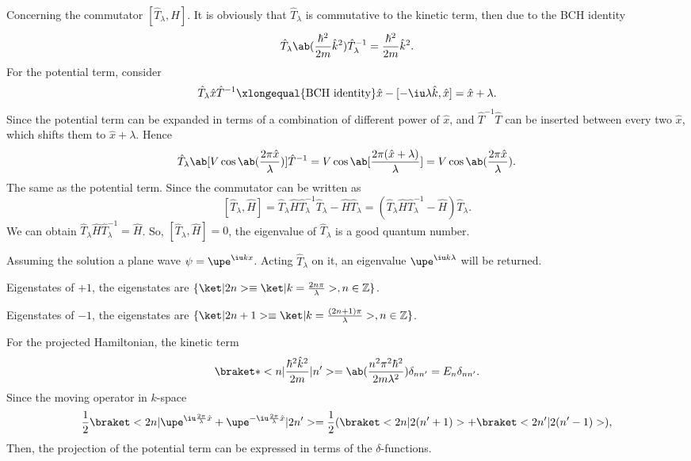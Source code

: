 \begin{solution}
\begin{enumext}
    Concerning the commutator $[\hat T_\lambda, H]$.
    It is obviously that $\hat T_\lambda$ is commutative to the kinetic term,
    then due to the BCH identity
    \[
      \hat T_\lambda \ab(\frac{\hbar^2}{2m} \hat k^2) \hat T_\lambda^{-1}
    = \frac{\hbar^2}{2m} \hat k^2.
    \]
    For the potential term, consider
    \[
      \hat T_\lambda \hat x \hat T^{-1} \xlongequal{\text{BCH identity}}
      \hat x - [-\iu\lambda \hat k, \hat x] = \hat x + \lambda.
    \]
    Since the potential term can be expanded in terms of a combination of
    different power of $\hat x$, and $\hat T^{-1}\hat T$ can be inserted between
    every two $\hat x$, which shifts them to $\hat x + \lambda$. Hence
    \[
      \hat T_\lambda \ab[V\cos\ab(\frac{2\pi\hat x}{\lambda})] \hat T^{-1}
    = V\cos\ab[\frac{2\pi(\hat x + \lambda)}{\lambda}]
    = V\cos\ab(\frac{2\pi\hat x}{\lambda}).
    \]
    The same as the potential term.
    Since the commutator can be written as
    \[
      [\hat T_\lambda, \hat H]
    = \hat T_\lambda \hat H \hat T_\lambda^{-1} \hat T_\lambda
      - \hat H \hat T_\lambda
    = (\hat T_\lambda \hat H \hat T_\lambda^{-1} - \hat H) \hat T_\lambda.
    \]
    We can obtain $\hat T_\lambda \hat H \hat T_\lambda^{-1} = \hat H$.
    So, $[\hat T_\lambda, \hat H] = 0$, the eigenvalue of $\hat T_\lambda$
    is a good quantum number.
    \item Assuming the solution a plane wave $\psi = \upe^{\iu k x}$.
    Acting $\hat T_\lambda$ on it, an eigenvalue $\upe^{\iu k\lambda}$
    will be returned.
    \begin{enumext}
      \item Eigenstates of $+1$, the eigenstates are
      $\{\ket|2n> \equiv \ket|k = \frac{2n\pi}{\lambda}>, n \in \mathbb Z\}$.
      \item Eigenstates of $-1$, the eigenstates are
      $\{\ket|2n + 1> \equiv
        \ket|k = \frac{(2n + 1)\pi}{\lambda}>, n \in \mathbb Z\}$.
    \end{enumext}
    For the projected Hamiltonian, the kinetic term
    \[
      \braket*<n|\frac{\hbar^2\hat k^2}{2m}|n'>
    = \ab(\frac{n^2\pi^2\hbar^2}{2m\lambda^2}) \delta_{nn'} = E_n \delta_{nn'}.
    \]
    Since the moving operator in $k$-space
    \[
      \frac12\braket<2n|\upe^{\iu\frac{2\pi}{\lambda}\hat x}
        + \upe^{-\iu\frac{2\pi}{\lambda}\hat x}|2n'>
    = \frac12(\braket<2n|2(n' + 1)> + \braket<2n'|2(n' - 1)>),
    \]
    Then, the projection of the potential term can be expressed in terms of the
    $\delta$-functions.
    \begin{enumext}

\end{enumext}
\end{enumext}
\end{solution}
